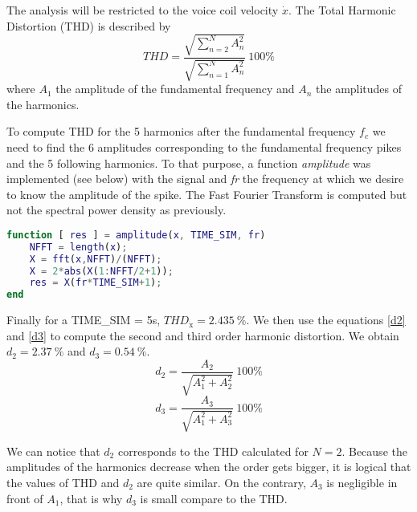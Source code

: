 The analysis will be restricted to the voice coil velocity $\dot{x}$. The Total Harmonic Distortion (THD) is described by
\begin{equation}
THD = \frac{\sqrt{\sum_{n=2}^{N}A_n^2}}{\sqrt{\sum_{n=1}^{N}A_n^2}} \ 100\%
\end{equation}
where $A_1$ the amplitude of the fundamental frequency and $A_n$ the amplitudes of the harmonics. 

To compute THD for the 5 harmonics after the fundamental frequency $f_c$ we need to find the 6 amplitudes corresponding to the fundamental frequency pikes and the 5 following harmonics. To that purpose, a function \textit{amplitude} was implemented (see below) with \textit{} the signal and \textit{fr} the frequency at which we desire to know the amplitude of the spike. The Fast Fourier Transform is computed but not the spectral power density as previously. 
\begin{lstlisting}[language=Matlab]
function [ res ] = amplitude(x, TIME_SIM, fr)
	NFFT = length(x);
	X = fft(x,NFFT)/(NFFT);	
	X = 2*abs(X(1:NFFT/2+1)); 
	res = X(fr*TIME_SIM+1);
end
\end{lstlisting}

Finally for a TIME\_SIM = 5s, $THD_{\dot{\text{x}}} = 2.435 \ \%$. 
We then use the equations \eqref{d2} and \eqref{d3} to compute the second and third order harmonic distortion. We obtain $d_2 = 2.37 \ \%$ and $d_3 = 0.54 \ \%$.
\begin{equation}
d_2 = \frac{A_2}{\sqrt{A_1^2 + A_2^2}} \ 100\%
\label{d2}
\end{equation}
\begin{equation}
d_3 = \frac{A_3}{\sqrt{A_1^2 + A_3^2}} \ 100\%
\label{d3}
\end{equation}

We can notice that $d_2$ corresponds to the THD calculated for $N=2$. Because the amplitudes of the harmonics decrease when the order gets bigger, it is logical that the values of THD and $d_2$ are quite similar. On the contrary, $A_3$ is negligible in front of $A_1$, that is why $d_3$ is small compare to the THD.